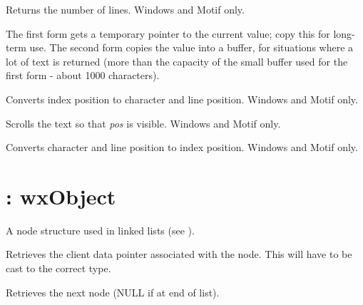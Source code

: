 

Returns the number of lines. Windows and Motif only.




The first form gets a temporary pointer to the current value; copy this for
long-term use. The second form copies the value into a buffer, for
situations where a lot of text is returned (more than the capacity of
the small buffer used for the first form - about 1000 characters).



Converts index position to character and line position. Windows and Motif only.



Scrolls the text so that {\it pos} is visible. Windows and Motif only.



Converts character and line position to index position. Windows and Motif only.




\section{: wxObject}\label{wxnode}

A node structure used in linked lists (see ).



Retrieves the client data pointer associated with the node. This will
have to be cast to the correct type.



Retrieves the next node (NULL if at end of list).

